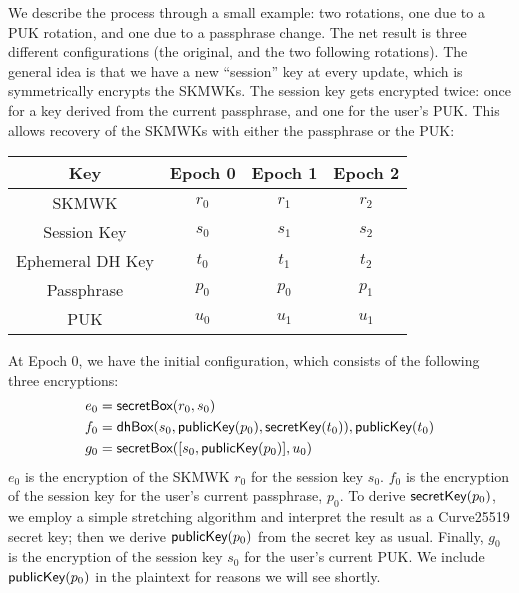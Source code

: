 We describe the process through a small example: two rotations, one due to a PUK rotation,
and one due to a passphrase change. The net result is three different configurations
(the original, and the two following rotations). The general idea is that we have a new ``session''
key at every update, which is symmetrically encrypts the SKMWKs. The session key gets encrypted
twice: once for a key derived from the current passphrase, and one for the user's PUK. This
allows recovery of the SKMWKs with either the passphrase or the PUK:
%
  \begin{center}
  \begin{tabular}{|c|c|c|c|}
    \hline
     Key & Epoch 0 & Epoch 1 & Epoch 2 \\
     \hline
     \hline
      SKMWK & $r_0$ & $r_1$ & $r_2$ \\
      Session Key & $s_0$ & $s_1$ & $s_2$ \\
      Ephemeral DH Key & $t_0$ & $t_1$ & $t_2$ \\
      Passphrase & $p_0$ & $p_0$ & $p_1$ \\
      PUK & $u_0$ & $u_1$ & $u_1$ \\
     \hline
  \end{tabular}
\end{center}
%
At Epoch 0, we have the initial configuration, which consists of the following three encryptions:
%
\begin{align*}
e_0 &= \textsf{secretBox}(r_0, s_0) \\
f_0 &= \textsf{dhBox}(s_0, \textsf{publicKey}(p_0), \textsf{secretKey}(t_0)), \textsf{publicKey}(t_0) \\
g_0 &= \textsf{secretBox}([s_0,\textsf{publicKey}(p_0)], u_0) \\
\end{align*}
%
$e_0$ is the encryption of the SKMWK $r_0$ for the session key $s_0$.  $f_0$ is the encryption 
of the session key for the user's current passphrase, $p_0$. To derive $\textsf{secretKey}(p_0)$, we employ
a simple stretching algorithm and interpret the result as a Curve25519 secret key; then we
derive $\textsf{publicKey}(p_0)$ from the secret key as usual. Finally, $g_0$ is the encryption of the session
key $s_0$ for the user's current PUK. We include $\textsf{publicKey}(p_0)$ in the plaintext for reasons
we will see shortly.
%

